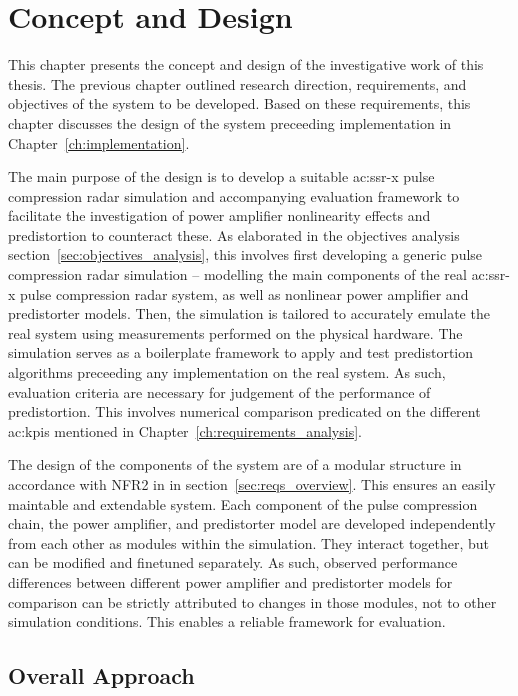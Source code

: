 %
\chapter{Concept and Design}\label{ch:concept_and_design}

This chapter presents the concept and design of the investigative work of this thesis. The previous chapter outlined research direction, requirements, and objectives of the system to be developed. Based on these requirements, this chapter discusses the design of the system preceeding implementation in Chapter~\ref{ch:implementation}. 

The main purpose of the design is to develop a suitable \gls{ac:ssr-x} pulse compression radar simulation and accompanying evaluation framework to facilitate the investigation of power amplifier nonlinearity effects and predistortion to counteract these. As elaborated in the objectives analysis section~\ref{sec:objectives_analysis}, this involves first developing a generic pulse compression radar simulation -- modelling the main components of the real \gls{ac:ssr-x} pulse compression radar system, as well as nonlinear power amplifier and predistorter models. Then, the simulation is tailored to accurately emulate the real system using measurements performed on the physical hardware. The simulation serves as a boilerplate framework to apply and test predistortion algorithms preceeding any implementation on the real system. As such, evaluation criteria are necessary for judgement of the performance of predistortion. This involves numerical comparison predicated on the different \glspl{ac:kpi} mentioned in Chapter~\ref{ch:requirements_analysis}. 

The design of the components of the system are of a modular structure in accordance with NFR2 in in section~\ref{sec:reqs_overview}. This ensures an easily maintable and extendable system. Each component of the pulse compression chain, the power amplifier, and predistorter model are developed independently from each other as modules within the simulation. They interact together, but can be modified and finetuned separately. As such, observed performance differences between different power amplifier and predistorter models for comparison can be strictly attributed to changes in those modules, not to other simulation conditions. This enables a reliable framework for evaluation.

\section{Overall Approach}

